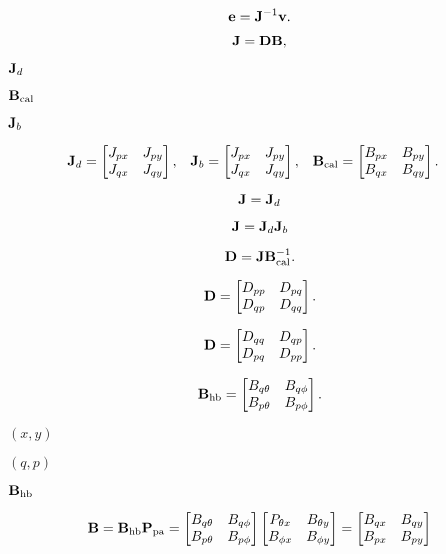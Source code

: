 \documentclass{article}
\begin{document}
\[ {\bf e} = {\bf J}^{-1}{\bf v}. \]
\pagebreak

\[ {\bf J} = {\bf D}{\bf B}, \]
\pagebreak

${\bf J}_d$
\pagebreak

${\bf B}_\text{cal}$
\pagebreak

${\bf J}_b$
\pagebreak

\begin{align*} {\bf J}_d &= \begin{bmatrix} J_{px} & J_{py} \\ J_{qx} & J_{qy} \end{bmatrix}, & {\bf J}_b &= \begin{bmatrix} J_{px} & J_{py} \\ J_{qx} & J_{qy} \end{bmatrix}, & {\bf B}_\text{cal} &= \begin{bmatrix} B_{px} & B_{py} \\ B_{qx} & B_{qy} \end{bmatrix}. \end{align*}
\pagebreak

\[ {\bf J} = {\bf J}_d \]
\pagebreak

\[ {\bf J} = {\bf J}_d {\bf J}_b \]
\pagebreak

\[ {\bf D} = {\bf J}{\bf B}_\text{cal}^{-1}. \]
\pagebreak

\[ {\bf D} = \begin{bmatrix} D_{pp} & D_{pq} \\ D_{qp} & D_{qq} \end{bmatrix}. \]
\pagebreak

\[ {\bf D} = \begin{bmatrix} D_{qq} & D_{qp} \\ D_{pq} & D_{pp} \end{bmatrix}. \]
\pagebreak

\[ {\bf B}_\text{hb} = \begin{bmatrix} B_{q\theta} & B_{q\phi} \\ B_{p\theta} & B_{p\phi} \end{bmatrix}. \]
\pagebreak

$(x,y)$
\pagebreak

$(q,p)$
\pagebreak

${\bf B}_\text{hb}$
\pagebreak

\[ {\bf B} = {\bf B}_\text{hb}{\bf P}_\text{pa} = \begin{bmatrix} B_{q\theta} & B_{q\phi} \\ B_{p\theta} & B_{p\phi} \end{bmatrix} \begin{bmatrix} P_{\theta x} & B_{\theta y} \\ B_{\phi x} & B_{\phi y} \end{bmatrix} = \begin{bmatrix} B_{qx} & B_{qy} \\ B_{px} & B_{py} \end{bmatrix} \]
\pagebreak
\end{document}
